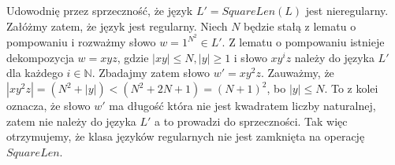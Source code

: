 \documentclass{article}
\begin{document}
Udowodnię przez sprzeczność, że język $L'=SquareLen(L)$ jest nieregularny. Załóżmy zatem, że język jest regularny. Niech $N$ będzie stałą z lematu o pompowaniu i rozważmy słowo $w=1^{N^2} \in L'$. Z lematu o pompowaniu istnieje dekompozycja $w=xyz$, gdzie $|xy|\le N,|y| \ge 1 $ i słowo $xy^i z$ należy do języka $L'$ dla każdego $i \in \mathbb{N}$.
Zbadajmy zatem słowo $w'=x y^2z$.
\hfill \break
Zauważmy, że $|x y^2z|= (N^2 + |y|)<(N^2 + 2N + 1) = (N+1)^2$, bo $|y| \le N$.
To z kolei oznacza, że słowo $w'$ ma długość która nie jest kwadratem liczby naturalnej, zatem nie należy do języka $L'$ a to prowadzi do sprzeczności. Tak więc otrzymujemy, że klasa języków regularnych nie jest zamknięta na operację $SquareLen$.
\end{document}
